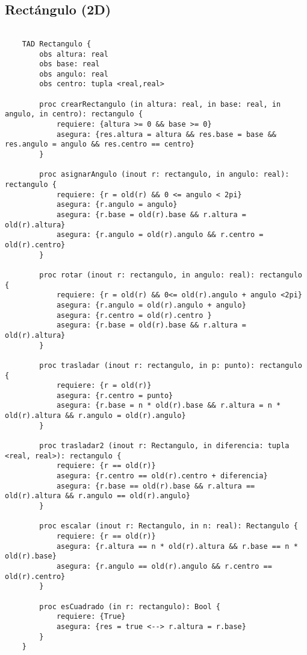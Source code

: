 \documentclass[10pt,a4paper]{article}
\begin{document}
\subsection{Rectángulo (2D)}
\begin{lstlisting}
 
    TAD Rectangulo {
        obs altura: real
        obs base: real
        obs angulo: real
        obs centro: tupla <real,real>

        proc crearRectangulo (in altura: real, in base: real, in angulo, in centro): rectangulo {
            requiere: {altura >= 0 && base >= 0}
            asegura: {res.altura = altura && res.base = base && res.angulo = angulo && res.centro == centro}
        }

        proc asignarAngulo (inout r: rectangulo, in angulo: real): rectangulo {
            requiere: {r = old(r) && 0 <= angulo < 2pi}
            asegura: {r.angulo = angulo}
            asegura: {r.base = old(r).base && r.altura = old(r).altura}
            asegura: {r.angulo = old(r).angulo && r.centro = old(r).centro}
        }

        proc rotar (inout r: rectangulo, in angulo: real): rectangulo {
            requiere: {r = old(r) && 0<= old(r).angulo + angulo <2pi}
            asegura: {r.angulo = old(r).angulo + angulo}
            asegura: {r.centro = old(r).centro }
            asegura: {r.base = old(r).base && r.altura = old(r).altura}
        }

        proc trasladar (inout r: rectangulo, in p: punto): rectangulo {
            requiere: {r = old(r)}
            asegura: {r.centro = punto}
            asegura: {r.base = n * old(r).base && r.altura = n * old(r).altura && r.angulo = old(r).angulo}
        }

        proc trasladar2 (inout r: Rectangulo, in diferencia: tupla <real, real>): rectangulo {
            requiere: {r == old(r)}
            asegura: {r.centro == old(r).centro + diferencia}
            asegura: {r.base == old(r).base && r.altura == old(r).altura && r.angulo == old(r).angulo}
        }

        proc escalar (inout r: Rectangulo, in n: real): Rectangulo {
            requiere: {r == old(r)}
            asegura: {r.altura == n * old(r).altura && r.base == n * old(r).base}
            asegura: {r.angulo == old(r).angulo && r.centro == old(r).centro}
        }
    
        proc esCuadrado (in r: rectangulo): Bool {
            requiere: {True}
            asegura: {res = true <--> r.altura = r.base}
        }
    } 
          
\end{lstlisting}
\end{document}
